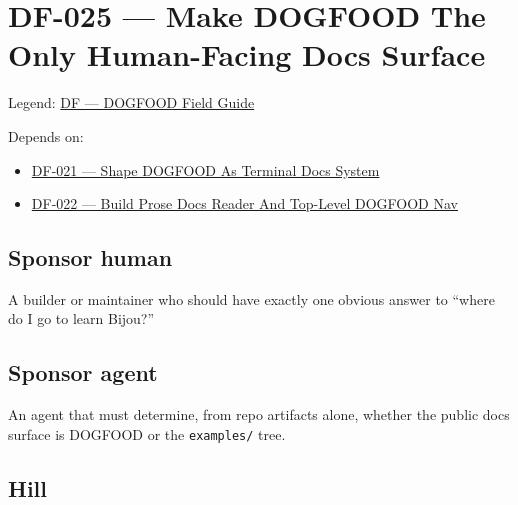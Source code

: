 \chapter{DF-025 --- Make DOGFOOD The Only Human-Facing Docs Surface}\label{record-086}

\smallskip

Legend: \href{https://github.com/flyingrobots/bijou/blob/1853ad902f6bf219326409e7f743a5a1d6517dbc/docs/legends/DF-dogfood-field-guide.md}{DF --- DOGFOOD Field Guide}

Depends on:

\begin{itemize}
\tightlist
\item
  \href{https://github.com/flyingrobots/bijou/blob/cbd70612140e7a450d764b3c7be1c6af878b99bc/docs/design/DF-021-shape-dogfood-as-terminal-docs-system.md}{DF-021 --- Shape DOGFOOD As Terminal Docs System}
\item
  \href{https://github.com/flyingrobots/bijou/blob/cbd70612140e7a450d764b3c7be1c6af878b99bc/docs/design/DF-022-build-prose-docs-reader-and-top-level-dogfood-nav.md}{DF-022 --- Build Prose Docs Reader And Top-Level DOGFOOD Nav}
\end{itemize}

\section{Sponsor human}\label{record-086-sponsor-human}

A builder or maintainer who should have exactly one obvious answer to ``where do I go to learn Bijou?''

\section{Sponsor agent}\label{record-086-sponsor-agent}

An agent that must determine, from repo artifacts alone, whether the public docs surface is DOGFOOD or the \texttt{e\allowbreak{}x\allowbreak{}a\allowbreak{}m\allowbreak{}p\allowbreak{}l\allowbreak{}e\allowbreak{}s\allowbreak{}/} tree.

\section{Hill}\label{record-086-hill}

